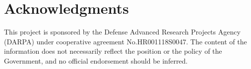 \documentclass[article]{jss}
\begin{document}
\hypertarget{acknowledgments}{%
\section*{Acknowledgments}\label{acknowledgments}}

\begin{tcolorbox}[enhanced jigsaw, left=2mm, opacityback=0, leftrule=.75mm, arc=.35mm, rightrule=.15mm, colframe=quarto-callout-color-frame, bottomrule=.15mm, breakable, toprule=.15mm, colback=white]

This project is sponsored by the Defense Advanced Research Projects
Agency (DARPA) under cooperative agreement No.HR001118S0047. The content
of the information does not necessarily reflect the position or the
policy of the Government, and no official endorsement should be
inferred.

\end{tcolorbox}


  
\end{document}
